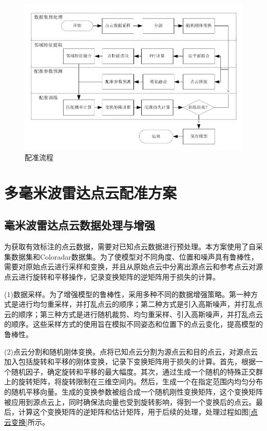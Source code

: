 \begin{figure}[htbp]
	\centering
	\includegraphics[width=0.9\linewidth]{figures/配准流程.pdf}
	\caption{配准流程}
	\label{fig:配准流程}
\end{figure}


\section{多毫米波雷达点云配准方案} \label{sec:配准方案整体设计}


\subsection{毫米波雷达点云数据处理与增强}
为获取有效标注的点云数据，需要对已知点云数据进行预处理。本方案使用了自采集数据集和Coloradar数据集\cite{ColoRadar}。为了使模型对不同角度、位置和噪声具有鲁棒性，需要对原始点云进行采样和变换，并且从原始点云中分离出源点云和参考点云对源点云进行旋转和平移操作，记录变换矩阵的逆矩阵用于损失的计算。
\par
(1)数据采样。为了增强模型的鲁棒性，采用多种不同的数据增强策略。第一种方式是进行均匀重采样，并打乱点云的顺序；第二种方式是引入高斯噪声，并打乱点云的顺序；第三种方式是进行随机裁剪、均匀重采样、引入高斯噪声，并打乱点云的顺序。这些采样方式的使用旨在模拟不同姿态和位置下的点云变化，提高模型的鲁棒性。
\par
(2)点云分割和随机刚体变换。点将已知点云分割为源点云和目的点云，对源点云加入包括旋转和平移的刚体变换，记录下变换矩阵用于损失的计算。首先，根据一个随机因子，确定旋转和平移的最大幅度。其次，通过生成一个随机的特殊正交群上的旋转矩阵\cite{cuisenaire1999fast}，将旋转限制在三维空间内。然后，生成一个在指定范围内均匀分布的随机平移向量。生成的变换参数被组合成一个随机刚性变换矩阵，这个变换矩阵被应用到源点云上，同时确保法向量也受到旋转影响，得到一个变换后的点云。最后，计算这个变换矩阵的逆矩阵和估计矩阵，用于后续的处理，处理过程如图\ref{点云变换}所示。


